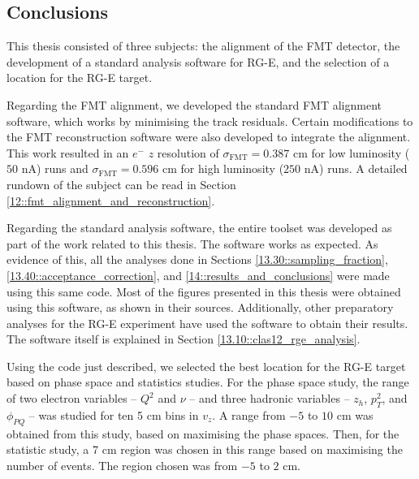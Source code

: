 \subsection{Conclusions}
\label{14.50::conclusions}
    This thesis consisted of three subjects: the alignment of the FMT detector, the development of a standard analysis software for RG-E, and the selection of a location for the RG-E target.

    Regarding the FMT alignment, we developed the standard FMT alignment software, which works by minimising the track residuals.
    Certain modifications to the FMT reconstruction software were also developed to integrate the alignment.
    This work resulted in an $e^-$ $z$ resolution of $\sigma_\text{FMT} = 0.387$ cm for low luminosity ($50$ nA) runs and $\sigma_\text{FMT} = 0.596$ cm for high luminosity ($250$ nA) runs.
    A detailed rundown of the subject can be read in Section \ref{12::fmt_alignment_and_reconstruction}.

    Regarding the standard analysis software, the entire toolset was developed as part of the work related to this thesis.
    The software works as expected.
    As evidence of this, all the analyses done in Sections \ref{13.30::sampling_fraction}, \ref{13.40::acceptance_correction}, and \ref{14::results_and_conclusions} were made using this same code.
    Most of the figures presented in this thesis were obtained using this software, as shown in their sources.
    Additionally, other preparatory analyses for the RG-E experiment have used the software to obtain their results.
    The software itself is explained in Section \ref{13.10::clas12_rge_analysis}.

    Using the code just described, we selected the best location for the RG-E target based on phase space and statistics studies.
    For the phase space study, the range of two electron variables -- $Q^2$ and $\nu$ -- and three hadronic variables -- $z_h$, $p_T^2$, and $\phi_{PQ}$ -- was studied for ten 5 cm bins in $v_z$.
    A range from $-5$ to $10$ cm was obtained from this study, based on maximising the phase spaces.
    Then, for the statistic study, a 7 cm region was chosen in this range based on maximising the number of events.
    The region chosen was from $-5$ to $2$ cm.

